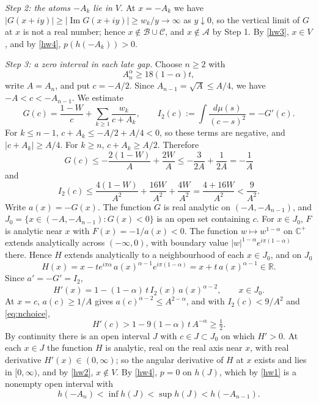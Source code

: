 \documentclass[11pt]{amsart}
\theoremstyle{definition}
\theoremstyle{remark}
\numberwithin{equation}{section}
\newcommand{\R}{\mathbb R}
\newcommand{\C}{\mathbb C}
\DeclareMathOperator{\Ima}{Im}
\begin{document}
\emph{Step 2: the atoms $-A_k$ lie in $V$.} At $x=-A_k$ we have $|G(x+iy)|\ge|\Ima G(x+iy)|\ge w_k/y\to\infty$ as $y\downarrow0$, so the vertical limit of $G$ at $x$ is not a real number; hence $x\notin\mathcal B\cup\mathcal C$, and $x\notin\mathcal A$ by Step 1. By \ref{hw3}, $x\in V$, and by \ref{hw4}, $p(h(-A_k))>0$.

\emph{Step 3: a zero interval in each late gap.} Choose $n\ge2$ with
\begin{equation}\label{eq:nchoice}
A_n^{\alpha}\ge18(1-\alpha)t,
\end{equation}
write $A=A_n$, and put $c=-A/2$. Since $A_{n-1}=\sqrt A\le A/4$, we have $-A<c<-A_{n-1}$. We estimate
\[
G(c)=\frac{1-W}{c}+\sum_{k\ge1}\frac{w_k}{c+A_k},\qquad I_2(c):=\int\frac{d\mu(s)}{(c-s)^2}=-G'(c).
\]
For $k\le n-1$, $c+A_k\le-A/2+A/4<0$, so these terms are negative, and $|c+A_k|\ge A/4$. For $k\ge n$, $c+A_k\ge A/2$. Therefore
\[
G(c)\le-\frac{2(1-W)}{A}+\frac{2W}{A}\le-\frac{3}{2A}+\frac{1}{2A}=-\frac1A
\]
and
\[
I_2(c)\le\frac{4(1-W)}{A^2}+\frac{16W}{A^2}+\frac{4W}{A^2}=\frac{4+16W}{A^2}<\frac9{A^2}.
\]
Write $a(x)=-G(x)$. The function $G$ is real analytic on $(-A,-A_{n-1})$, and $J_0=\{x\in(-A,-A_{n-1}):G(x)<0\}$ is an open set containing $c$. For $x\in J_0$, $F$ is analytic near $x$ with $F(x)=-1/a(x)<0$. The function $w\mapsto w^{1-\alpha}$ on $\C^+$ extends analytically across $(-\infty,0)$, with boundary value $|w|^{1-\alpha}e^{i\pi(1-\alpha)}$ there. Hence $H$ extends analytically to a neighbourhood of each $x\in J_0$, and on $J_0$
\[
H(x)=x-te^{i\pi\alpha}\,a(x)^{\alpha-1}e^{i\pi(1-\alpha)}=x+t\,a(x)^{\alpha-1}\in\R .
\]
Since $a'=-G'=I_2$,
\begin{equation}\label{eq:Hprime}
H'(x)=1-(1-\alpha)\,t\,I_2(x)\,a(x)^{\alpha-2},\qquad x\in J_0 .
\end{equation}
At $x=c$, $a(c)\ge1/A$ gives $a(c)^{\alpha-2}\le A^{2-\alpha}$, and with $I_2(c)<9/A^2$ and \eqref{eq:nchoice},
\[
H'(c)>1-9(1-\alpha)\,t\,A^{-\alpha}\ge\tfrac12 .
\]
By continuity there is an open interval $J$ with $c\in J\subset J_0$ on which $H'>0$. At each $x\in J$ the function $H$ is analytic, real on the real axis near $x$, with real derivative $H'(x)\in(0,\infty)$; so the angular derivative of $H$ at $x$ exists and lies in $[0,\infty)$, and by \ref{hw2}, $x\notin V$. By \ref{hw4}, $p=0$ on $h(J)$, which by \ref{hw1} is a nonempty open interval with
\[
h(-A_n)<\inf h(J)<\sup h(J)<h(-A_{n-1}).
\]
\end{document}
